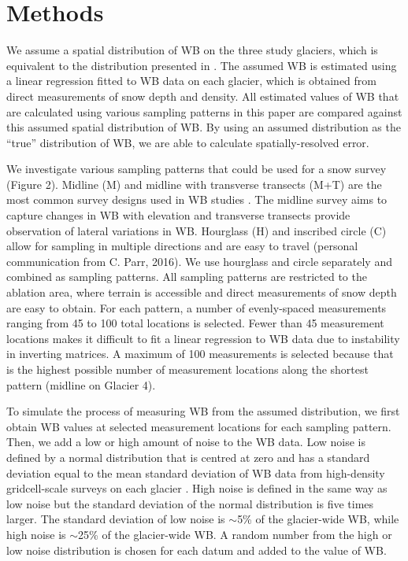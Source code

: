 \documentclass[twocolumn, letterpaper]{igs}
\begin{document}
\section{Methods}

We assume a spatial distribution of WB on the three study glaciers, which is equivalent to the distribution presented in \cite{Pulwicki2017}. The assumed WB is estimated using a linear regression fitted to WB data on each glacier, which is obtained from direct measurements of snow depth and density. All estimated values of WB that are calculated using various sampling patterns in this paper are compared against this assumed spatial distribution of WB. By using an assumed distribution as the ``true'' distribution of WB, we are able to calculate spatially-resolved error.  

We investigate various sampling patterns that could be used for a snow survey (Figure 2). Midline (M) and midline with transverse transects (M+T) are the most common survey designs used in WB studies \citep[e.g.][]{Kaser2002,Machguth2006}. The midline survey aims to capture changes in WB with elevation and transverse transects provide observation of lateral variations in WB. Hourglass (H) and inscribed circle (C) allow for sampling in multiple directions and are easy to travel (personal communication from C. Parr, 2016). We use hourglass and circle separately and combined as sampling patterns. All sampling patterns are restricted to the ablation area, where terrain is accessible and direct measurements of snow depth are easy to obtain. For each pattern, a number of evenly-spaced measurements ranging from 45 to 100 total locations is selected. Fewer than 45 measurement locations makes it difficult to fit a linear regression to WB data due to instability in inverting matrices. A maximum of 100 measurements is selected because that is the highest possible number of measurement locations along the shortest pattern (midline on Glacier 4). 

To simulate the process of measuring WB from the assumed distribution, we first obtain WB values at selected measurement locations for each sampling pattern. Then, we add a low or high amount of noise to the WB data. Low noise is defined by a normal distribution that is centred at zero and has a standard deviation equal to the mean standard deviation of WB data from high-density gridcell-scale surveys on each glacier \citep[see][for details]{Pulwicki2017}. High noise is defined in the same way as low noise but the standard deviation of the normal distribution is five times larger. The standard deviation of low noise is $\sim$5\% of the glacier-wide WB, while high noise is $\sim$25\% of the glacier-wide WB. A random number from the high or low noise distribution is chosen for each datum and added to the value of WB. 
\end{document}
